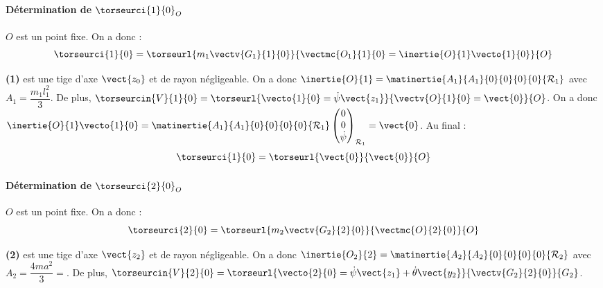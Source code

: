 \ifprof
\begin{corrige} ~\\

\paragraph*{Détermination de  $\torseurci{1}{0}_O$}

$O$ est un point fixe. On a donc :
$$
\torseurci{1}{0}=
\torseurl{
m_1 \vectv{G_1}{1}{0}
}{
\vectmc{O_1}{1}{0} = \inertie{O}{1} \vecto{1}{0}
}{O}
$$

\textbf{(1)} est une tige d'axe $\vect{z_0}$ et de rayon négligeable. On a donc 
$\inertie{O}{1} =  \matinertie{A_1}{A_1}{0}{0}{0}{0}{\mathcal{R}_1} $ avec $A_1=\dfrac{m_1l_1^2}{3}$. 
De plus,
$
\torseurcin{V}{1}{0}=
\torseurl{
\vecto{1}{0}=\dot{\psi}\vect{z_1}
}{
\vectv{O}{1}{0}=\vect{0}
}{O}
$. 
On a donc  $\inertie{O}{1} \vecto{1}{0} =   \matinertie{A_1}{A_1}{0}{0}{0}{0}{\mathcal{R}_1} \begin{pmatrix} 0 \\ 0 \\  \dot{\psi} \end{pmatrix}_{\mathcal{R}_1}=\vect{0}$.
Au final :
$$
\torseurci{1}{0}=
\torseurl{
\vect{0}
}{
\vect{0}
}{O}
$$


\paragraph*{Détermination de  $\torseurci{2}{0}_O$}

$O$ est un point fixe. On a donc :
$$
\torseurci{2}{0}=
\torseurl{
m_2 \vectv{G_2}{2}{0}
}{
\vectmc{O}{2}{0} %
}{O}
$$

\textbf{(2)} est une tige d'axe $\vect{z_2}$ et de rayon négligeable. On a donc 
$\inertie{O_2}{2} =  \matinertie{A_2}{A_2}{0}{0}{0}{0}{\mathcal{R}_2} $ avec $A_2=\dfrac{4ma^2}{3}=$. 
De plus,
$
\torseurcin{V}{2}{0}=
\torseurl{
\vecto{2}{0}=\dot{\psi}\vect{z_1}+\dot{\theta}\vect{y_2}
}{
\vectv{G_2}{2}{0}
}{G_2}
$. 


\end{corrige}
